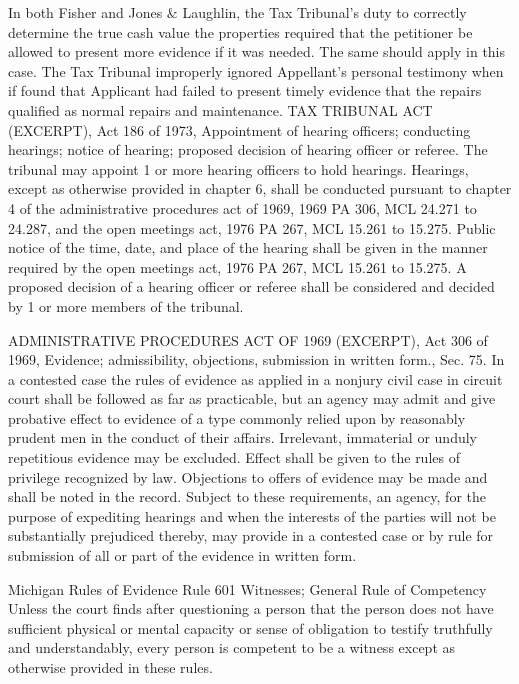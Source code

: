 \documentclass[12pt,\documentclassflag]{michiganCourtOfAppealsBrief}
\begin{document}
	In both Fisher and Jones & Laughlin, the Tax Tribunal's duty to correctly determine the true cash value the properties required that the petitioner be allowed to present more evidence if it was needed. The same should apply in this case. 
The Tax Tribunal improperly ignored Appellant's personal testimony when if found that Applicant had failed to present timely evidence that the repairs qualified as normal repairs and maintenance.
TAX TRIBUNAL ACT (EXCERPT), Act 186 of 1973,  Appointment of hearing officers; conducting hearings; notice of hearing; proposed decision of hearing officer or referee.
The tribunal may appoint 1 or more hearing officers to hold hearings. Hearings, except as otherwise provided in chapter 6, shall be conducted pursuant to chapter 4 of the administrative procedures act of 1969, 1969 PA 306, MCL 24.271 to 24.287, and the open meetings act, 1976 PA 267, MCL 15.261 to 15.275. Public notice of the time, date, and place of the hearing shall be given in the manner required by the open meetings act, 1976 PA 267, MCL 15.261 to 15.275. A proposed decision of a hearing officer or referee shall be considered and decided by 1 or more members of the tribunal.
 
ADMINISTRATIVE PROCEDURES ACT OF 1969 (EXCERPT), Act 306 of 1969,  Evidence; admissibility, objections, submission in written form., Sec. 75.
In a contested case the rules of evidence as applied in a nonjury civil case in circuit court shall be followed as far as practicable, but an agency may admit and give probative effect to evidence of a type commonly relied upon by reasonably prudent men in the conduct of their affairs. Irrelevant, immaterial or unduly repetitious evidence may be excluded. Effect shall be given to the rules of privilege recognized by law. Objections to offers of evidence may be made and shall be noted in the record. Subject to these requirements, an agency, for the purpose of expediting hearings and when the interests of the parties will not be substantially prejudiced thereby, may provide in a contested case or by rule for submission of all or part of the evidence in written form.

Michigan Rules of Evidence Rule 601 Witnesses; General Rule of Competency
Unless the court finds after questioning a person that the person does not have
sufficient physical or mental capacity or sense of obligation to testify truthfully and
understandably, every person is competent to be a witness except as otherwise
provided in these rules.
 
\end{document}
